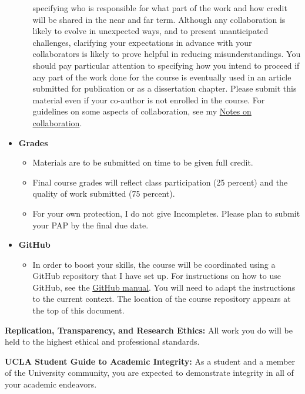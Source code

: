 \documentclass[11pt]{article}
\begin{document}
\begin{itemize}
\begin{itemize}
specifying who is responsible for what part of the work and how credit will be 
shared in the near and far term. Although any collaboration is likely to evolve in unexpected ways, and to present unanticipated
challenges, clarifying your expectations in advance with your collaborators is likely to prove helpful in reducing misunderstandings.
You should pay particular attention to specifying how you intend to proceed if any part of the work done for the 
course is eventually used in an article submitted for publication or as a dissertation chapter. Please submit this
			material even if your co-author is not enrolled in the course.	For guidelines on some aspects of collaboration, see my \href{https://docs.wixstatic.com/ugd/02c1bf_454ad351837e4014b5342e1a54182b54.pdf}{Notes on collaboration}.				
			\end{itemize}
			\item \textbf{Grades}
			\begin{itemize}
			\item Materials are to be submitted on time to be given full credit. 			
			\item Final course grades will reflect class participation (25 percent) and the quality of work submitted (75 percent). 
			\item For your own protection, I do not give Incompletes. Please plan to submit your PAP by the final due date.
			\end{itemize}
			\item \textbf{GitHub}
			\begin{itemize}
			\item In order to boost your skills, the course will be coordinated using a GitHub repository that I have set up. For instructions on how to use GitHub, see the \href{https://docs.wixstatic.com/ugd/02c1bf_98ecb1e8230249c3bae7f56b6b68bc63.pdf}{GitHub manual}. You will need to adapt the instructions to the current context. The location of the course repository appears at the top of this document. 
\end{itemize}
\end{itemize}

\textbf {\large Replication, Transparency, and Research Ethics:} All work you do will be held to the highest ethical and professional standards. 


\textbf {\large UCLA Student Guide to Academic Integrity:} As a student and a member of the University community,
you are expected to demonstrate integrity in all of your academic
endeavors. 
\end{document}
